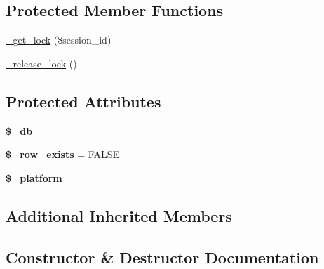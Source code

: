 \subsection*{Protected Member Functions}
\begin{DoxyCompactItemize}
\item 
\mbox{\hyperlink{class_c_i___session__database__driver_a89d94d77a9dc0e3b29dbbc0f7938d215}{\+\_\+get\+\_\+lock}} (\$session\+\_\+id)
\item 
\mbox{\hyperlink{class_c_i___session__database__driver_ad6f6bc60a6fbfd6aecba9c7bde898a39}{\+\_\+release\+\_\+lock}} ()
\end{DoxyCompactItemize}
\subsection*{Protected Attributes}
\begin{DoxyCompactItemize}
\item 
\mbox{\label{class_c_i___session__database__driver_a220bedc8d1941eb3d12131f15e6acaf2}} 
{\bfseries \$\+\_\+db}
\item 
\mbox{\label{class_c_i___session__database__driver_abcc9e84309cd2b6e6ef82440fece874e}} 
{\bfseries \$\+\_\+row\+\_\+exists} = F\+A\+L\+SE
\item 
\mbox{\label{class_c_i___session__database__driver_aef2747ea62bcdab960b9baf2ac6fe948}} 
{\bfseries \$\+\_\+platform}
\end{DoxyCompactItemize}
\subsection*{Additional Inherited Members}


\subsection{Constructor \& Destructor Documentation}
\mbox{\label{class_c_i___session__database__driver_a4f63614a226b138ec1dc68ec27fa4b14}} 
